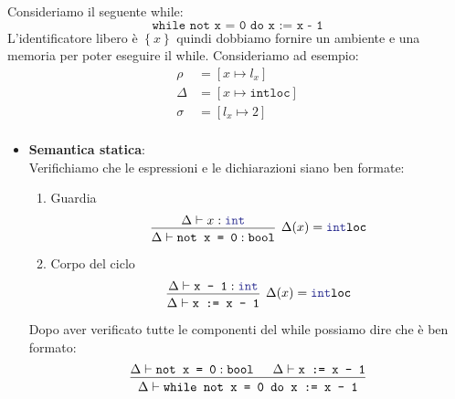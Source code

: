 \documentclass[a4paper]{article}
\begin{document}
\begin{example}
  \newcommand\ruleCol{Sepia}
  Consideriamo il seguente while:
  \[
    \texttt{while not x = 0 do x := x - 1}
  \] 
  L'identificatore libero è \( \left\{ x \right\} \) quindi dobbiamo fornire un
  ambiente e una memoria per poter eseguire il while. Consideriamo ad esempio:
  \[
    \begin{aligned}
      \rho &= \left[ x \mapsto l_x \right] \\
      \Delta &= \left[ x \mapsto \texttt{intloc} \right] \\
      \sigma &= \left[ l_x \mapsto 2 \right] \\
    \end{aligned}
  \] 
  \begin{itemize}
    \item \textbf{Semantica statica}:\\
      Verifichiamo che le espressioni e le dichiarazioni siano ben formate:
      \begin{enumerate}
        \item Guardia
          \[
            \begin{prooftree}
              \hypo{ 
                \Delta \vdash x : \texttt{\textcolor{Blue}{int}}
              }
              \infer1[\( 
                \Delta(x) = \texttt{\textcolor{Blue}{int}loc}
              \)]{ 
                \Delta \vdash \texttt{not x = 0} : \texttt{bool}
              }
            \end{prooftree}
          \] 

        \item Corpo del ciclo
          \[
            \begin{prooftree}
              \hypo{ 
                \Delta \vdash \texttt{x - 1} : \texttt{\textcolor{Blue}{int}}
              }
              \infer1[\( 
                \Delta(x) = \texttt{\textcolor{Blue}{int}loc}
              \)]{
                \Delta \vdash \texttt{x := x - 1}
              }
            \end{prooftree}
          \] 
      \end{enumerate}
      Dopo aver verificato tutte le componenti del while possiamo dire che è ben
      formato:
      \[
        \begin{prooftree}
          \hypo{ 
            \Delta \vdash \texttt{not x = 0} : \texttt{bool}
          }
          \hypo{ 
            \Delta \vdash \texttt{x := x - 1}
          }
          \infer2{ 
            \Delta \vdash \texttt{while not x = 0 do x := x - 1}
          }
        \end{prooftree}
      \] 


\end{itemize}
\end{example}
\end{document}
